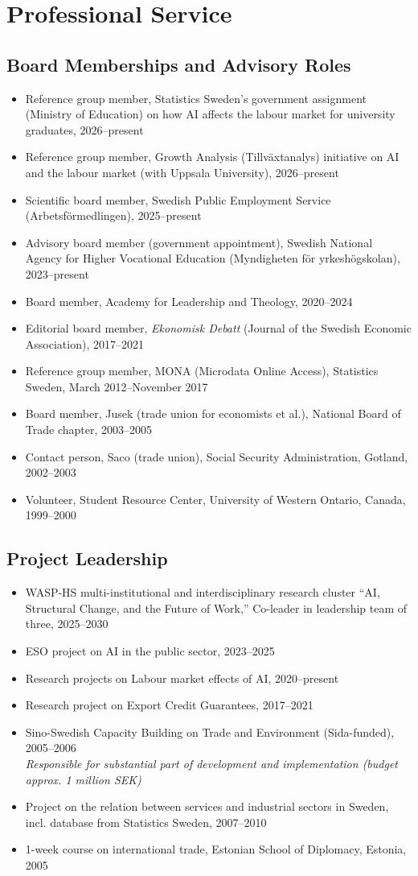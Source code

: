 \documentclass[11pt,a4paper]{article}
\newcommand{\cventry}[1]{\item #1}
\begin{document}
\section{Professional Service}

\subsection{Board Memberships and Advisory Roles}

\begin{itemize}
  \cventry{Reference group member, Statistics Sweden's government assignment (Ministry of Education) on how AI affects the labour market for university graduates, 2026--present} %
  \cventry{Reference group member, Growth Analysis (Tillväxtanalys) initiative on AI and the labour market (with Uppsala University), 2026--present}
  \cventry{Scientific board member, Swedish Public Employment Service (Arbetsförmedlingen), 2025--present}
  \cventry{Advisory board member (government appointment), Swedish National Agency for Higher Vocational Education (Myndigheten för yrkeshögskolan), 2023--present}
  \cventry{Board member, Academy for Leadership and Theology, 2020--2024}
  \cventry{Editorial board member, \textit{Ekonomisk Debatt} (Journal of the Swedish Economic Association), 2017--2021}
  \cventry{Reference group member, MONA (Microdata Online Access), Statistics Sweden, March 2012--November 2017}
  \cventry{Board member, Jusek (trade union for economists et al.), National Board of Trade chapter, 2003--2005}
  \cventry{Contact person, Saco (trade union), Social Security Administration, Gotland, 2002--2003}
  \cventry{Volunteer, Student Resource Center, University of Western Ontario, Canada, 1999--2000}
\end{itemize}

\subsection{Project Leadership}

\begin{itemize}
  \cventry{WASP-HS multi-institutional and interdisciplinary research cluster ``AI, Structural Change, and the Future of Work,'' Co-leader in leadership team of three, 2025--2030}
  \cventry{ESO project on AI in the public sector, 2023--2025}
  \cventry{Research projects on Labour market effects of AI, 2020--present}
  \cventry{Research project on Export Credit Guarantees, 2017--2021}
  \cventry{Sino-Swedish Capacity Building on Trade and Environment (Sida-funded), 2005--2006\\
  \textit{Responsible for substantial part of development and implementation (budget approx. 1 million SEK)}}
  \cventry{Project on the relation between services and industrial sectors in Sweden, incl. database from Statistics Sweden, 2007--2010}
  \cventry{1-week course on international trade, Estonian School of Diplomacy, Estonia, 2005}
\end{itemize}
\end{document}
